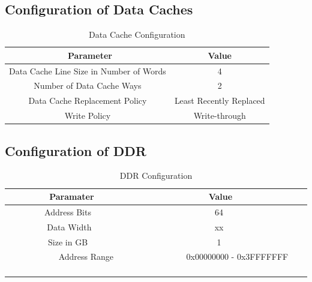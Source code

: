 \documentclass{listhesis}
\begin{document}
\subsection{Configuration of Data Caches}
\begin{table}[h!]
\begin{center}
 \begin{tabular}{|| c | c ||} 
 \hline
 \ \textbf{Parameter} & \textbf{Value}  \\ [0.5 ex] 
 \hline\hline
  Data Cache Line Size in Number of Words &  4  \\
  \hline
  Number of Data Cache Ways &  2  \\
  \hline
  Data Cache Replacement Policy  & Least Recently Replaced  \\ 
 \hline
  Write Policy  &  Write-through  \\
  \hline
\end{tabular}
 \caption{Data Cache Configuration}
 \label{table:properties}
\end{center}
\end{table}

\subsection{Configuration of DDR}
\begin{table}[h!]
\begin{center}
 \begin{tabular}{|| c | c ||} 
 \hline
 \ \textbf{Paramater} & \textbf{Value}  \\ [0.5 ex] 
 \hline\hline
 \ \ \ \ \ \ \ \ Address Bits \ \ \ \ \ \ \ \ & \ \ \ \ \ \ \ \ 64 \ \ \ \ \ \ \ \ \\ 
 \hline
 \ \ \ \ \ \ \ \ Data Width\ \ \ \ \ \ \ \ & \ \ \ \ \ \ \ \ xx \ \ \ \ \ \ \ \ \\
 \hline
 \ \ \ \ \ \ \ \ Size in GB \ \ \ \ \ \ \ \ & \ \ \ \ \ \ \ \ 1 \ \ \ \ \ \ \ \  \\
 \hline
 \ \ \ \ \ \ \ \ Address Range \ \ \ \ \ \ \ \ & \ \ \ \ \ \ \ \ 0x00000000 - 0x3FFFFFFF \ \ \ \ \ \ \ \  \\
  \hline
\end{tabular}
 \caption{DDR Configuration}
 \label{table:DDR}
\end{center}
\end{table}
\end{document}
